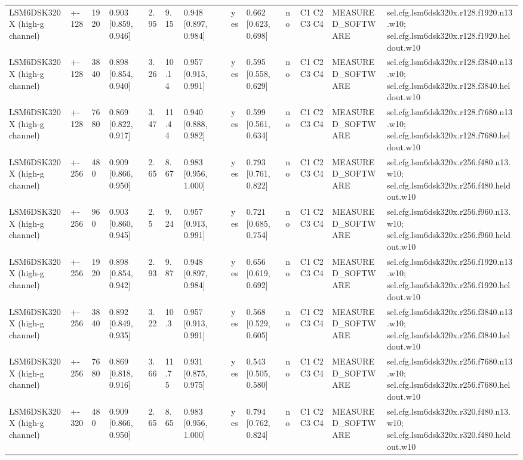 \begin{table}[t]
\begin{tabular}{llllllllllllll}
LSM6DSK320X (high-g channel) & +-128 & 1920 & 0.903 [0.859, 0.946] & 2.95 & 9.15 & 0.948 [0.897, 0.984] &  & yes & 0.662 [0.623, 0.698] & no & C1 C2 C3 C4 & MEASURED\_SOFTWARE & sel.cfg.lsm6dsk320x.r128.f1920.n13.w10; sel.cfg.lsm6dsk320x.r128.f1920.heldout.w10 \\
LSM6DSK320X (high-g channel) & +-128 & 3840 & 0.898 [0.854, 0.940] & 3.26 & 10.14 & 0.957 [0.915, 0.991] &  & yes & 0.595 [0.558, 0.629] & no & C1 C2 C3 C4 & MEASURED\_SOFTWARE & sel.cfg.lsm6dsk320x.r128.f3840.n13.w10; sel.cfg.lsm6dsk320x.r128.f3840.heldout.w10 \\
LSM6DSK320X (high-g channel) & +-128 & 7680 & 0.869 [0.822, 0.917] & 3.47 & 11.44 & 0.940 [0.888, 0.982] &  & yes & 0.599 [0.561, 0.634] & no & C1 C2 C3 C4 & MEASURED\_SOFTWARE & sel.cfg.lsm6dsk320x.r128.f7680.n13.w10; sel.cfg.lsm6dsk320x.r128.f7680.heldout.w10 \\
LSM6DSK320X (high-g channel) & +-256 & 480 & 0.909 [0.866, 0.950] & 2.65 & 8.67 & 0.983 [0.956, 1.000] &  & yes & 0.793 [0.761, 0.822] & no & C1 C2 C3 C4 & MEASURED\_SOFTWARE & sel.cfg.lsm6dsk320x.r256.f480.n13.w10; sel.cfg.lsm6dsk320x.r256.f480.heldout.w10 \\
LSM6DSK320X (high-g channel) & +-256 & 960 & 0.903 [0.860, 0.945] & 2.5 & 9.24 & 0.957 [0.913, 0.991] &  & yes & 0.721 [0.685, 0.754] & no & C1 C2 C3 C4 & MEASURED\_SOFTWARE & sel.cfg.lsm6dsk320x.r256.f960.n13.w10; sel.cfg.lsm6dsk320x.r256.f960.heldout.w10 \\
LSM6DSK320X (high-g channel) & +-256 & 1920 & 0.898 [0.854, 0.942] & 2.93 & 9.87 & 0.948 [0.897, 0.984] &  & yes & 0.656 [0.619, 0.692] & no & C1 C2 C3 C4 & MEASURED\_SOFTWARE & sel.cfg.lsm6dsk320x.r256.f1920.n13.w10; sel.cfg.lsm6dsk320x.r256.f1920.heldout.w10 \\
LSM6DSK320X (high-g channel) & +-256 & 3840 & 0.892 [0.849, 0.935] & 3.22 & 10.3 & 0.957 [0.913, 0.991] &  & yes & 0.568 [0.529, 0.605] & no & C1 C2 C3 C4 & MEASURED\_SOFTWARE & sel.cfg.lsm6dsk320x.r256.f3840.n13.w10; sel.cfg.lsm6dsk320x.r256.f3840.heldout.w10 \\
LSM6DSK320X (high-g channel) & +-256 & 7680 & 0.869 [0.818, 0.916] & 3.66 & 11.75 & 0.931 [0.875, 0.975] &  & yes & 0.543 [0.505, 0.580] & no & C1 C2 C3 C4 & MEASURED\_SOFTWARE & sel.cfg.lsm6dsk320x.r256.f7680.n13.w10; sel.cfg.lsm6dsk320x.r256.f7680.heldout.w10 \\
LSM6DSK320X (high-g channel) & +-320 & 480 & 0.909 [0.866, 0.950] & 2.65 & 8.65 & 0.983 [0.956, 1.000] &  & yes & 0.794 [0.762, 0.824] & no & C1 C2 C3 C4 & MEASURED\_SOFTWARE & sel.cfg.lsm6dsk320x.r320.f480.n13.w10; sel.cfg.lsm6dsk320x.r320.f480.heldout.w10 \\

\end{tabular}
\end{table}
